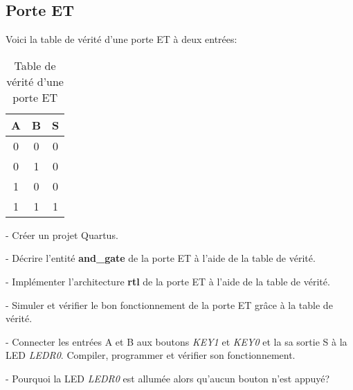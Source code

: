\subsection{Porte ET}
Voici la table de vérité d'une porte ET à deux entrées:
\begin{table}[ht]
    \centering
    \begin{tabular}{c c|c} 
        A & B & S \\
        \hline
        0 & 0 & 0 \\
        0 & 1 & 0 \\
        1 & 0 & 0 \\
        1 & 1 & 1
    \end{tabular}
    \caption{Table de vérité d'une porte ET}
\end{table}

- Créer un projet Quartus.

\medskip

- Décrire l'entité \textbf{and\_gate} de la porte ET à l'aide de la table de vérité.

\medskip

- Implémenter l'architecture \textbf{rtl} de la porte ET à l'aide de la table de vérité.

\medskip

- Simuler et vérifier le bon fonctionnement de la porte ET grâce à la table de vérité.

\medskip

- Connecter les entrées A et B aux boutons \textit{KEY1} et \textit{KEY0} et la sa sortie S à la LED \textit{LEDR0}. Compiler, programmer et vérifier son fonctionnement. 

\medskip

- Pourquoi la LED \textit{LEDR0} est allumée alors qu'aucun bouton n'est appuyé?